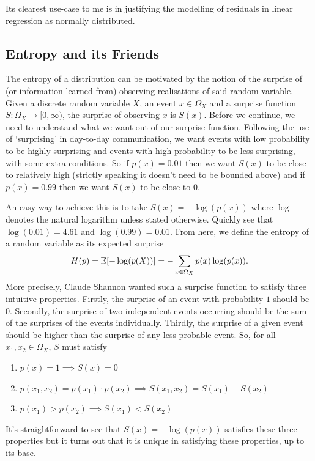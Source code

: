 \documentclass[11pt]{article}
\begin{document}
\begin{appendices}
Its clearest use-case to me is in justifying the modelling of residuals in linear regression as normally distributed.

\subsection{Entropy and its Friends}
\label{app:entropy}

The entropy of a distribution can be motivated by the notion of the surprise of (or information learned from) observing realisations of said random variable. Given a discrete random variable $X$, an event $x\in\Omega_X$ and a surprise function $S:\Omega_X\rightarrow[0,\infty)$, the surprise of observing $x$ is $S(x)$. Before we continue, we need to understand what we want out of our surprise function. Following the use of `surprising' in day-to-day communication, we want events with low probability to be highly surprising and events with high probability to be less surprising, with some extra conditions. So if $p(x)=0.01$ then we want $S(x)$ to be close to relatively high (strictly speaking it doesn't need to be bounded above) and if $p(x)=0.99$ then we want $S(x)$ to be close to 0.

An easy way to achieve this is to take $S(x)=-\log(p(x))$ where $\log$ denotes the natural logarithm unless stated otherwise. Quickly see that $\log(0.01)=4.61$ and $\log(0.99)=0.01$. From here, we define the entropy of a random variable as its expected surprise
$$
H(p)
=
\mathbb{E}[-\log(p(X))]
=
-\sum_{x\in \Omega_X}p(x)\log(p(x)).
$$
More precisely, Claude Shannon wanted such a surprise function to satisfy three intuitive properties. Firstly, the surprise of an event with probability $1$ should be $0$. Secondly, the surprise of two independent events occurring should be the sum of the surprises of the events individually. Thirdly, the surprise of a given event should be higher than the surprise of any less probable event. So, for all $x_1,x_2\in\Omega_X$, $S$ must satisfy
\begin{enumerate}
    \item $p(x)=1\implies S(x)=0$
    \item $p(x_1,x_2)=p(x_1)\cdot p(x_2)\implies S(x_1,x_2)=S(x_1)+S(x_2)$
    \item $p(x_1)>p(x_2)\implies S(x_1)<S(x_2)$
\end{enumerate}
It's straightforward to see that $S(x)=-\log(p(x))$ satisfies these three properties but it turns out that it is unique in satisfying these properties, up to its base.


\end{appendices}
\end{document}
